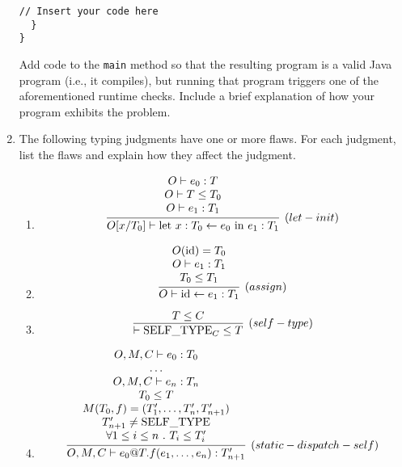 \documentclass[12pt]{article}
\begin{document}
\begin{enumerate}
{\begin{lstlisting}[caption=totally innocuous Java code]
    // Insert your code here
  }
}
\end{lstlisting}

Add code to the \texttt{main} method so that the resulting program is
a valid Java program (i.e., it compiles), but running that program
triggers one of the aforementioned runtime checks. Include a brief
explanation of how your program exhibits the problem.
}
\item{The following typing judgments have one or more flaws. For each
  judgment, list the flaws and explain how they affect the judgment.
\begin{enumerate}

\item
$$
\infer[(let-init)]
{ O[ x / T_0 ] \vdash \text{let} \ x : T_0 \leftarrow e_0 \ \text{in}
  \ e_1 : T_1}
{ \begin{array}{c} 
O   \vdash e_0 : T \\
O   \vdash T \leq T_0 \\
O   \vdash e_1 : T_1
  \end{array}
}
$$

\item
$$
\infer[(assign)]
  { O \vdash \mathrm{id} \leftarrow e_1 : T_1 }
  { \begin{array}{c}
    O(\mathrm{id}) = T_0 \\
    O \vdash e_1 : T_1 \\
    T_0 \leq T_1
    \end{array} 
  } 
$$

\item
$$
\infer[(self-type)]
{ \vdash \mathrm{SELF\_TYPE}_C \leq T }
{ T \leq C } 
$$

\item
$$
\infer[(static-dispatch-self)]
{ O,M,C \vdash e_0 @ T . f ( e_1, \dots, e_n) : T_{n+1}' }
{ \begin{array}{c}
  O,M,C \vdash e_0 : T_0 \\
  \dots \\
  O,M,C \vdash e_n : T_n \\
  T_0 \leq T \\
  M(T_0,f) = ( T_1', \dots, T_n', T_{n+1}' ) \\
  T_{n+1}' \neq \mathrm{SELF\_TYPE} \\
  \forall 1 \leq i \leq n ~.~ T_i \leq T_i' 
  \end{array} 
} 
$$





\end{enumerate}}
\end{enumerate}
\end{document}
